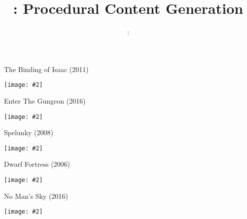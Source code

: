 \usepackage{../../beamerthemeFalmouthGamesAcademy}
\usepackage{multimedia}
\graphicspath{ {../../} }


\usepackage[normalem]{ulem}
\usepackage{wasysym}

\usepackage{pdfpages}

\usetikzlibrary{arrows,automata}




\title{\sessionnumber: Procedural Content Generation}
\subtitle{\modulecode: \moduletitle}

\frame{\titlepage} 

\newcommand{\pictureslideb}[3]{
	\begin{frame}{#1}
		\begin{center}
			\texttt{[image: \#2]}
			
			\vspace{6pt}
			
			#3
		\end{center}
	\end{frame}
}

\newcommand{\pictureslide}[2]{
	\begin{frame}{#1}
		\begin{center}
			\texttt{[image: \#2]}
		\end{center}
	\end{frame}
}

\newcommand{\pictureslidew}[2]{
	\begin{frame}{#1}
		\begin{center}
			\texttt{[image: \#2]}
		\end{center}
	\end{frame}
}



\pictureslide{The Binding of Isaac (2011)}{isaac}
\pictureslide{Enter The Gungeon (2016)}{enterthegungeon}
\pictureslide{Spelunky (2008)}{spelunky}
\pictureslide{Dwarf Fortress (2006)}{dwarffortress}
\pictureslide{No Man's Sky (2016)}{nomanssky}


%

%

%

%


